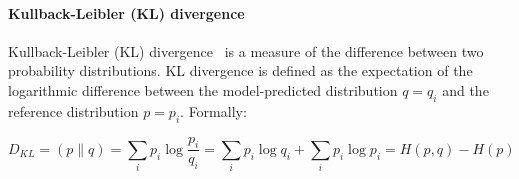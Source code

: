 \paragraph{Kullback-Leibler (KL) divergence}\label{KL_divergence}
Kullback-Leibler (KL) divergence~\cite{dykstraKullbackLeiblerInformation2005} is a measure of the difference between two probability distributions. 
KL divergence is defined as the expectation of the logarithmic difference between the model-predicted distribution $q = {q_i}$ and the reference distribution $p = {p_i}$. 
Formally:

\begin{equation}
\label{KL:equation}
	D_{KL} = (p \parallel q) =
	\sum_{i}{p_i\log{\frac{p_i}{q_i}}} = 
	\sum_{i}{p_i\log{q_i}} + \sum_{i}{p_i\log{p_i}} =
	H(p, q) - H(p)
\end{equation}